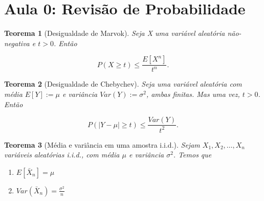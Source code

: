 \documentclass{article}
\newtheorem{theorem}{Teorema}
\begin{document}
\textbf{}
\vspace{2.6mm}

\textbf{}
\vspace{2.6mm}

\textbf{}
\vspace{2.6mm}

\textbf{}
\vspace{2.6mm}

\textbf{}
\vspace{2.6mm}

\textbf{}
\vspace{2.6mm}

\textbf{}
\vspace{2.6mm}

\textbf{}
\vspace{2.6mm}

\textbf{}

\newpage

\section*{Aula 0: Revisão de Probabilidade}
\label{s0}

\begin{theorem}[Desigualdade de Marvok]
Seja X uma variável aleatória não-negativa e $t > 0$. Então

\begin{equation}
    P(X \geq t) \leq \frac{E[X^n]}{t^n}.
\end{equation}
\end{theorem}

\begin{theorem}[Desigualdade de Chebychev]
Seja uma variável aleatória com média $E[Y] := \mu$ e variância $Var(Y) := \sigma^2$, ambas finitas. Mas uma vez, $t > 0$. Então

\begin{equation}
    P(|Y - \mu| \geq t) \leq \frac{Var(Y)}{t^2}.
\end{equation}
\end{theorem}

\begin{theorem}[Média e variância em uma amostra i.i.d.]
Sejam $X_1, X_2, \ldots, X_n$ variáveis aleatórias i.i.d., com média $\mu$ e variância $\sigma^2$. Temos que

\begin{enumerate}
    \item[(i)] $E[\bar{X}_n] = \mu$
    \item[(ii)] $Var(\bar{X}_n) = \frac{\sigma^2}{n}$
\end{enumerate}
\end{theorem}
\end{document}
